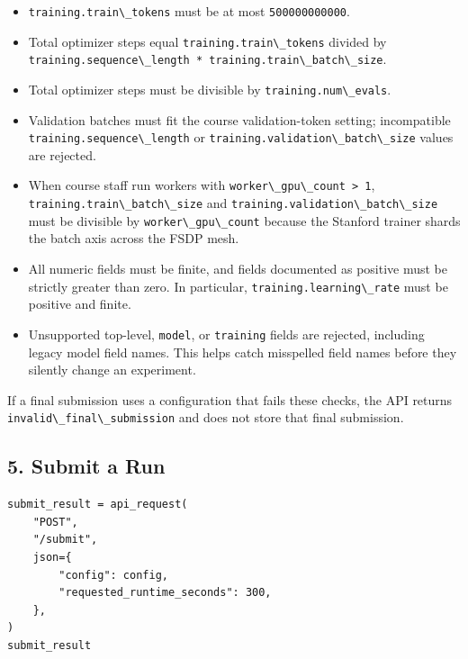 \documentclass[
]{article}
\newcommand{\passthrough}[1]{#1}
\begin{document}
\begin{itemize}
\item
  \passthrough{\lstinline!training.train\_tokens!} must be at most
  \passthrough{\lstinline!500000000000!}.
\item
  Total optimizer steps equal
  \passthrough{\lstinline!training.train\_tokens!} divided by
  \passthrough{\lstinline!training.sequence\_length * training.train\_batch\_size!}.
\item
  Total optimizer steps must be divisible by
  \passthrough{\lstinline!training.num\_evals!}.
\item
  Validation batches must fit the course validation-token setting;
  incompatible \passthrough{\lstinline!training.sequence\_length!} or
  \passthrough{\lstinline!training.validation\_batch\_size!} values are
  rejected.
\item
  When course staff run workers with
  \passthrough{\lstinline!worker\_gpu\_count > 1!},
  \passthrough{\lstinline!training.train\_batch\_size!} and
  \passthrough{\lstinline!training.validation\_batch\_size!} must be
  divisible by \passthrough{\lstinline!worker\_gpu\_count!} because the
  Stanford trainer shards the batch axis across the FSDP mesh.
\item
  All numeric fields must be finite, and fields documented as positive
  must be strictly greater than zero. In particular,
  \passthrough{\lstinline!training.learning\_rate!} must be positive and
  finite.
\item
  Unsupported top-level, \passthrough{\lstinline!model!}, or
  \passthrough{\lstinline!training!} fields are rejected, including
  legacy model field names. This helps catch misspelled field names
  before they silently change an experiment.
\end{itemize}

If a final submission uses a configuration that fails these checks, the
API returns \passthrough{\lstinline!invalid\_final\_submission!} and
does not store that final submission.

\hypertarget{submit-a-run}{%
\subsection{5. Submit a Run}\label{submit-a-run}}

\begin{verbatim}
submit_result = api_request(
    "POST",
    "/submit",
    json={
        "config": config,
        "requested_runtime_seconds": 300,
    },
)
submit_result
\end{verbatim}
\end{document}
